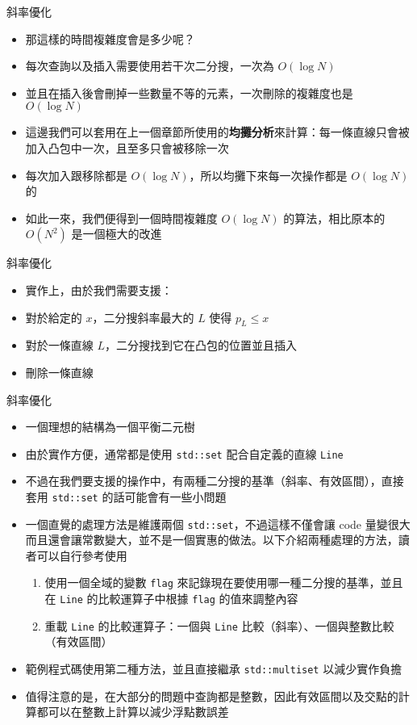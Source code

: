 \documentclass[standalone]{beamer}
\begin{document}
\begin{frame}{斜率優化}
  \begin{itemize}
    \item 那這樣的時間複雜度會是多少呢？
    \item 每次查詢以及插入需要使用若干次二分搜，一次為 $O(\log{N})$
    \item 並且在插入後會刪掉一些數量不等的元素，一次刪除的複雜度也是 $O(\log{N})$
    \item 這邊我們可以套用在上一個章節所使用的\textbf{均攤分析}來計算：每一條直線只會被加入凸包中一次，且至多只會被移除一次
    \item 每次加入跟移除都是 $O(\log{N})$，所以均攤下來每一次操作都是 $O(\log{N})$ 的
    \item 如此一來，我們便得到一個時間複雜度 $O(\log{N})$ 的算法，相比原本的 $O(N^2)$ 是一個極大的改進
  \end{itemize}
\end{frame}

\begin{frame}{斜率優化}
  \begin{itemize}
    \item 實作上，由於我們需要支援：
    \item 對於給定的 $x$，二分搜斜率最大的 $L$ 使得 $p_L \leq x$
    \item 對於一條直線 $L$，二分搜找到它在凸包的位置並且插入
    \item 刪除一條直線
  \end{itemize}
\end{frame}

\begin{frame}{斜率優化}
  \begin{itemize}
    \item 一個理想的結構為一個平衡二元樹
    \item 由於實作方便，通常都是使用 \texttt{std::set} 配合自定義的直線 \texttt{Line}
    \item 不過在我們要支援的操作中，有兩種二分搜的基準（斜率、有效區間），直接套用 \texttt{std::set} 的話可能會有一些小問題
    \item 一個直覺的處理方法是維護兩個 \texttt{std::set}，不過這樣不僅會讓 code 量變很大而且還會讓常數變大，並不是一個實惠的做法。以下介紹兩種處理的方法，讀者可以自行參考使用
    \begin{enumerate}
      \item 使用一個全域的變數 \texttt{flag} 來記錄現在要使用哪一種二分搜的基準，並且在 \texttt{Line} 的比較運算子中根據 \texttt{flag} 的值來調整內容
      \item 重載 \texttt{Line} 的比較運算子：一個與 \texttt{Line} 比較（斜率）、一個與整數比較（有效區間）
    \end{enumerate}
    \item 範例程式碼使用第二種方法，並且直接繼承 \texttt{std::multiset} 以減少實作負擔
    \item 值得注意的是，在大部分的問題中查詢都是整數，因此有效區間以及交點的計算都可以在整數上計算以減少浮點數誤差
  \end{itemize}
\end{frame}
\end{document}
